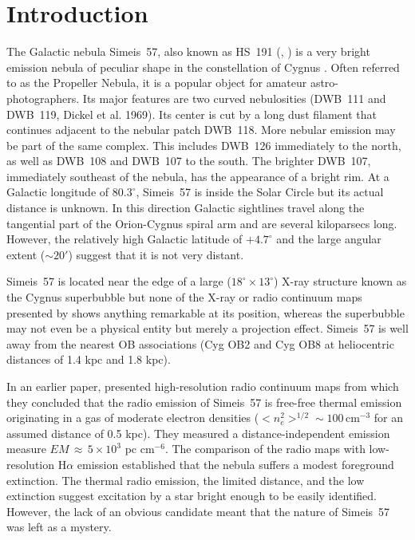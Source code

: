 \documentclass{aa}
\begin{document}

   \maketitle
%

\section{Introduction}
The Galactic nebula Simeis~57, also known as HS~191 (\citet{Gaze1951},
\citet{Gaze1955}) is a very bright emission nebula of peculiar shape
in the constellation of Cygnus \citep[cf. ][]{Parker1979}. Often
referred to as the Propeller Nebula, it is a popular object for
amateur astro-photographers. Its major features are two curved
nebulosities (DWB~111 and DWB~119, Dickel et al. 1969). Its center is
cut by a long dust filament that continues adjacent to the nebular
patch DWB~118. More nebular emission may be part of the same complex.
This includes DWB~126 immediately to the north, as well as DWB~108 and
DWB~107 to the south. The brighter DWB~107, immediately southeast of
the nebula, has the appearance of a bright rim. At a Galactic
longitude of $80.3^{\circ}$, Simeis~57 is inside the Solar Circle but
its actual distance is unknown. In this direction Galactic sightlines
travel along the tangential part of the Orion-Cygnus spiral arm and
are several kiloparsecs long. However, the relatively high Galactic
latitude of $+4.7^{\circ}$ and the large angular extent ($\sim20'$)
suggest that it is not very distant.

Simeis~57 is located near the edge of a large
($18^{\circ}\times13^{\circ}$) X-ray structure known as the Cygnus
superbubble \citep{cash1980} but none of the X-ray or radio
continuum maps presented by \citet{uyaniker2001} shows anything
remarkable at its position, whereas the superbubble may not even be
a physical entity but merely a projection effect. Simeis~57 is well
away from the nearest OB associations (Cyg OB2 and Cyg OB8 at
heliocentric distances of 1.4 kpc and 1.8 kpc).

In an earlier paper, \citet{israel2003} presented high-resolution radio
continuum maps from which they concluded that the radio emission of
Simeis~57 is free-free thermal emission originating in a gas of
moderate electron densities ($<n_e^2>^{1/2}\sim100\, \mathrm{cm^{-3}}$
for an assumed distance of 0.5 kpc). They measured a
distance-independent emission measure $EM\,\approx\,5\times10^{3}$ pc
cm$^{-6}$. The comparison of the radio maps with low-resolution
H$\alpha$ emission established that the nebula suffers a modest
foreground extinction. The thermal radio emission, the limited
distance, and the low extinction suggest excitation by a star bright
enough to be easily identified. However, the lack of an obvious
candidate meant that the nature of Simeis~57 was left as a mystery.
\end{document}
